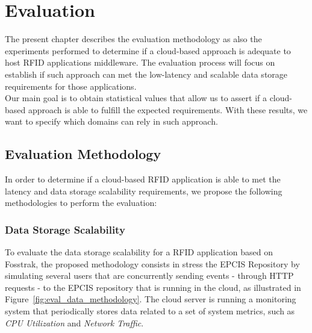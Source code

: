 
\chapter{Evaluation}
\label{chapter:evaluation}
The present chapter describes the evaluation methodology as also the experiments performed to determine
if a cloud-based approach is adequate to host \gls{RFID} applications middleware. The evaluation process
will focus on establish if such approach can met the low-latency and scalable data storage requirements
for those applications.\\

Our main goal is to obtain statistical values that allow us to assert if a cloud-based approach is able
to fulfill the expected requirements. With these results, we want to specify which domains can rely in such
approach.

\section{Evaluation Methodology}
\label{sec:eval_methodology}
In order to determine if a cloud-based \gls{RFID} application is able to met the latency and data
storage scalability requirements, we propose the following methodologies to perform the evaluation:

\subsection{Data Storage Scalability}
\label{sub:eval_methodology_data}
To evaluate the data storage scalability for a \gls{RFID} application based on Fosstrak, the proposed
methodology consists in stress the \gls{EPCIS} Repository by simulating several users that are
concurrently sending events - through \gls{HTTP} requests - to the \gls{EPCIS} repository that is
running in the cloud, as illustrated in Figure~\ref{fig:eval_data_methodology}. The cloud server is
running a monitoring system that periodically stores data related to a set of system metrics,
such as \textit{CPU Utilization} and \textit{Network Traffic}.\\

